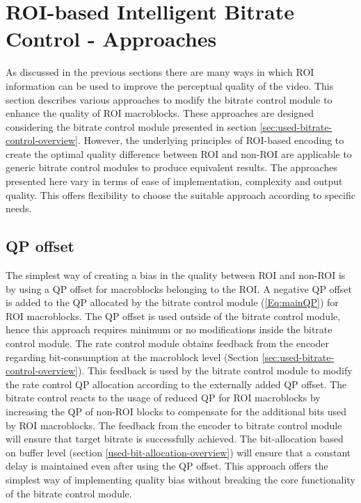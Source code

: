 \documentclass[11pt]{article} %
\begin{document}
\section{ROI-based Intelligent Bitrate Control - Approaches}
As discussed in the previous sections there are many ways in which ROI information can be used to improve the perceptual quality of the video. This section describes various approaches to modify the bitrate control module to enhance the quality of ROI macroblocks. These approaches are designed considering the bitrate control module presented in section \ref{sec:used-bitrate-control-overview}. However, the underlying principles of ROI-based encoding to create the optimal quality difference between ROI and non-ROI are applicable to generic bitrate control modules to produce equivalent results. The approaches presented here vary in terms of ease of implementation, complexity and output quality. This offers flexibility to choose the suitable approach according to specific needs.

\subsection{QP offset}
The simplest way of creating a bias in the quality between ROI and non-ROI is by using a QP offset for macroblocks belonging to the ROI. A negative QP offset is added to the QP allocated by the bitrate control module (\ref{Eq:mainQP}) for ROI macroblocks. The QP offset is used outside of the bitrate control module, hence this approach requires minimum or no modifications inside the bitrate control module. The rate control module obtains feedback from the encoder regarding bit-consumption at the macroblock level (Section \ref{sec:used-bitrate-control-overview}). This feedback is used by the bitrate control module to modify the rate control QP allocation according to the externally added QP offset. The bitrate control reacts to the usage of reduced QP for ROI macroblocks by increasing the QP of non-ROI blocks to compensate for the additional bits used by ROI macroblocks. The feedback from the encoder to bitrate control module will ensure that target bitrate is successfully achieved. The bit-allocation based on buffer level (section \ref{used-bit-allocation-overview}) will ensure that a constant delay is maintained even after using the QP offset. This approach offers the simplest way of implementing quality bias without breaking the core functionality of the bitrate control module.  
\end{document}
